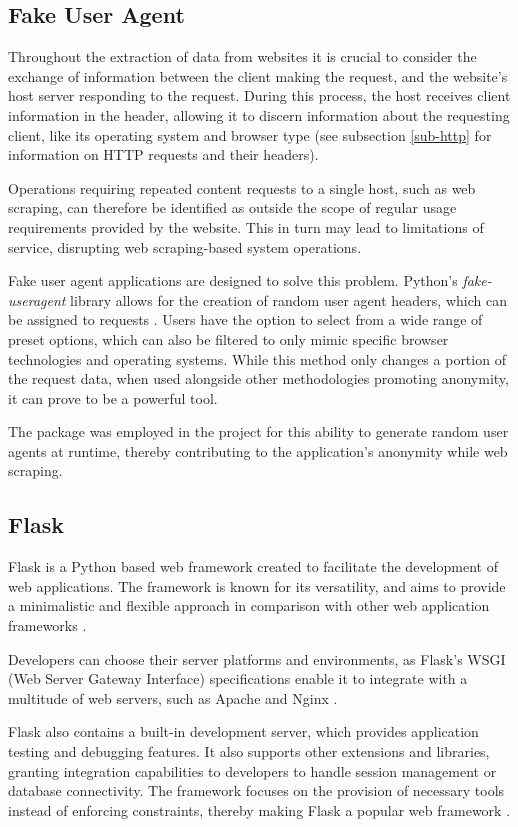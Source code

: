 \documentclass{thesis-ekf}
\theoremstyle{definition}
\theoremstyle{remark}
\begin{document}
{\subsection{Fake User Agent}
Throughout the extraction of data from websites it is crucial to consider the exchange of information between the client making the request, and the website's host server responding to the request. During this process, the host receives client information in the header, allowing it to discern information about the requesting client, like its operating system and browser type (see subsection \ref{sub-http} for information on HTTP requests and their headers).

Operations requiring repeated content requests to a single host, such as web scraping, can therefore be identified as outside the scope of regular usage requirements provided by the website. This in turn may lead to limitations of service, disrupting web scraping-based system operations.

Fake user agent applications are designed to solve this problem. Python's \emph{fake-useragent} library allows for the creation of random user agent headers, which can be assigned to requests \cite{fake-useragent}. Users have the option to select from a wide range of preset options, which can also be filtered to only mimic specific browser technologies and operating systems. While this method only changes a portion of the request data, when used alongside other methodologies promoting anonymity, it can prove to be a powerful tool.

The package was employed in the project for this ability to generate random user agents at runtime, thereby contributing to the application's anonymity while web scraping.

\subsection{Flask}
Flask is a Python based web framework created to facilitate the development of web applications. The framework is known for its versatility, and aims to provide a minimalistic and flexible approach in comparison with other web application frameworks \cite{docs-flask}. 

Developers can choose their server platforms and environments, as Flask's WSGI (Web Server Gateway Interface) specifications enable it to integrate with a multitude of web servers, such as Apache and Nginx \cite{flask}.

Flask also contains a built-in development server, which provides application testing and debugging features. It also supports other extensions and libraries, granting integration capabilities to developers to handle session management or database connectivity. The framework focuses on the provision of necessary tools instead of enforcing constraints, thereby making Flask a popular web framework \cite{flask}.

}
\end{document}

